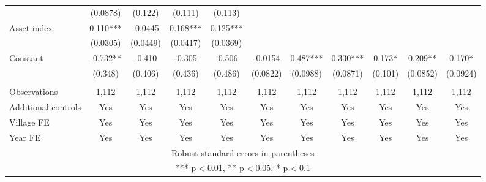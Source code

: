 \documentclass[]{article}
\begin{document}
\begin{tabular}{lcccccccccc}
 & (0.0878) & (0.122) & (0.111) & (0.113) &  &  &  &  &  &  \\
Asset index & 0.110*** & -0.0445 & 0.168*** & 0.125*** &  &  &  &  &  &  \\
 & (0.0305) & (0.0449) & (0.0417) & (0.0369) &  &  &  &  &  &  \\
Constant & -0.732** & -0.410 & -0.305 & -0.506 & -0.0154 & 0.487*** & 0.330*** & 0.173* & 0.209** & 0.170* \\
 & (0.348) & (0.406) & (0.436) & (0.486) & (0.0822) & (0.0988) & (0.0871) & (0.101) & (0.0852) & (0.0924) \\
 &  &  &  &  &  &  &  &  &  &  \\
Observations & 1,112 & 1,112 & 1,112 & 1,112 & 1,112 & 1,112 & 1,112 & 1,112 & 1,112 & 1,112 \\
Additional controls & Yes & Yes & Yes & Yes & Yes & Yes & Yes & Yes & Yes & Yes \\
Village FE & Yes & Yes & Yes & Yes & Yes & Yes & Yes & Yes & Yes & Yes \\
 Year FE & Yes & Yes & Yes & Yes & Yes & Yes & Yes & Yes & Yes & Yes \\ \hline
\multicolumn{11}{c}{ Robust standard errors in parentheses} \\
\multicolumn{11}{c}{ *** p$<$0.01, ** p$<$0.05, * p$<$0.1} \\
\end{tabular}
\end{document}
